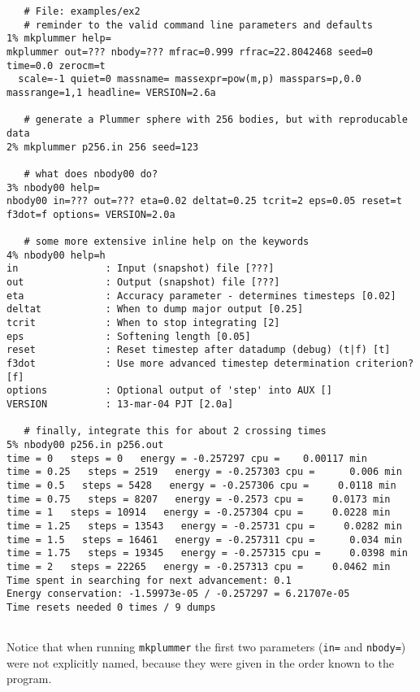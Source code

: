 \footnotesize\begin{verbatim}
   # File: examples/ex2
   # reminder to the valid command line parameters and defaults
1% mkplummer help=
mkplummer out=??? nbody=??? mfrac=0.999 rfrac=22.8042468 seed=0 time=0.0 zerocm=t 
  scale=-1 quiet=0 massname= massexpr=pow(m,p) masspars=p,0.0 massrange=1,1 headline= VERSION=2.6a

   # generate a Plummer sphere with 256 bodies, but with reproducable data
2% mkplummer p256.in 256 seed=123

   # what does nbody00 do?
3% nbody00 help=
nbody00 in=??? out=??? eta=0.02 deltat=0.25 tcrit=2 eps=0.05 reset=t f3dot=f options= VERSION=2.0a

   # some more extensive inline help on the keywords
4% nbody00 help=h
in               : Input (snapshot) file [???]
out              : Output (snapshot) file [???]
eta              : Accuracy parameter - determines timesteps [0.02]
deltat           : When to dump major output [0.25]
tcrit            : When to stop integrating [2]
eps              : Softening length [0.05]
reset            : Reset timestep after datadump (debug) (t|f) [t]
f3dot            : Use more advanced timestep determination criterion? [f]
options          : Optional output of 'step' into AUX []
VERSION          : 13-mar-04 PJT [2.0a]

   # finally, integrate this for about 2 crossing times
5% nbody00 p256.in p256.out
time = 0   steps = 0   energy = -0.257297 cpu =    0.00117 min
time = 0.25   steps = 2519   energy = -0.257303 cpu =      0.006 min
time = 0.5   steps = 5428   energy = -0.257306 cpu =     0.0118 min
time = 0.75   steps = 8207   energy = -0.2573 cpu =     0.0173 min
time = 1   steps = 10914   energy = -0.257304 cpu =     0.0228 min
time = 1.25   steps = 13543   energy = -0.25731 cpu =     0.0282 min
time = 1.5   steps = 16461   energy = -0.257311 cpu =      0.034 min
time = 1.75   steps = 19345   energy = -0.257315 cpu =     0.0398 min
time = 2   steps = 22265   energy = -0.257313 cpu =     0.0462 min
Time spent in searching for next advancement: 0.1
Energy conservation: -1.59973e-05 / -0.257297 = 6.21707e-05
Time resets needed 0 times / 9 dumps


\end{verbatim}\normalsize

Notice that when running {\tt mkplummer} the first two parameters ({\tt in=} and {\tt nbody=})
were not explicitly named, because they were given in the order known to the program.



